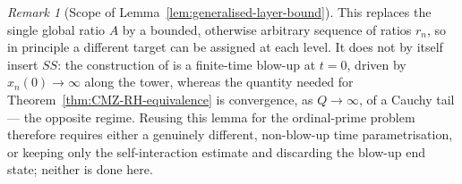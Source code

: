 \documentclass[11pt]{amsart}
\numberwithin{equation}{section}
\theoremstyle{plain}
\theoremstyle{definition}
\theoremstyle{remark}
\newtheorem{remark}[theorem]{Remark}
\begin{document}
\begin{remark}[Scope of Lemma~\ref{lem:generalised-layer-bound}]
\label{rem:generalised-layer-scope}
This replaces the single global ratio $A$ by a bounded, otherwise arbitrary
sequence of ratios $r_n$, so in principle a different target can be assigned
at each level.  It does not by itself insert $SS$: the construction of
\cite{CordobaMartinezZoroaZheng2023} is a finite-time blow-up at $t=0$,
driven by $x_n(0)\to\infty$ along the tower, whereas the quantity needed for
Theorem~\ref{thm:CMZ-RH-equivalence} is convergence, as $Q\to\infty$, of a
Cauchy tail --- the opposite regime.  Reusing this lemma for the
ordinal-prime problem therefore requires either a genuinely different,
non-blow-up time parametrisation, or keeping only the self-interaction
estimate and discarding the blow-up end state; neither is done here.
\end{remark}
\end{document}
